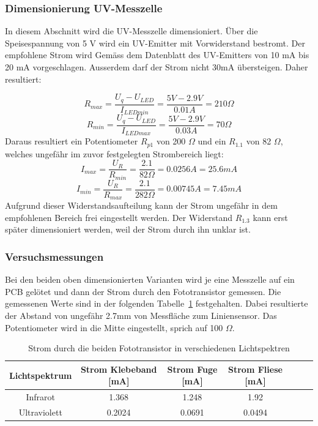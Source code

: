 \documentclass[main.tex]{subfiles} %
\begin{document}

\subsubsection{Dimensionierung UV-Messzelle}
In diesem Abschnitt wird die UV-Messzelle dimensioniert.
Über die Speisespannung von 5 V wird ein UV-Emitter mit Vorwiderstand bestromt. Der empfohlene Strom
wird Gemäss dem Datenblatt des UV-Emitters von 10 mA bis 20 mA vorgeschlagen. Ausserdem darf der Strom nicht 
30mA übersteigen. Daher resultiert: 

\[
    R_{max} = \frac{U_q - U_{LED}}{I_{LEDmin}} = \frac{5 V - 2.9 V}{0.01A} = 210 \Omega
\]
\[
    R_{min} = \frac{U_q - U_{LED}}{I_{LEDmax}} = \frac{5 V - 2.9 V}{0.03A} = 70 \Omega
\]
Daraus resultiert ein Potentiometer $R_{p1}$ von 200 $\Omega$ und ein $R_{1.1}$ von 82 $\Omega$, welches ungefähr im zuvor festgelegten
Strombereich liegt:
\[
    I_{max} = \frac{U_R}{R_{min}} = \frac{2.1}{82 \Omega} = 0.0256 A = 25.6 mA
\]
\[
    I_{min} = \frac{U_R}{R_{max}} = \frac{2.1}{282 \Omega} = 0.00745 A = 7.45 mA
\]
Aufgrund dieser Widerstandsaufteilung kann der Strom ungefähr in dem empfohlenen Bereich frei eingestellt werden.
Der Widerstand $R_{1.3}$ kann erst später dimensioniert werden, weil der Strom durch ihn unklar ist.

\subsubsection{Versuchsmessungen}
Bei den beiden oben dimensionierten Varianten wird je eine Messzelle auf ein PCB gelötet und dann der Strom durch den
Fototransistor gemessen. Die gemessenen Werte sind in der folgenden Tabelle~\ref{tab:Strommessungen_einzeln} festgehalten. Dabei resultierte der 
Abstand von ungefähr 2.7mm von Messfläche zum Liniensensor. Das Potentiometer wird in die Mitte eingestellt, sprich
auf 100 $\Omega$.

\begin{table}[h]                                    
    \centering
    \begin{tabular}{|c|c|c|c|c|c|c|}                        
        \hline
        \textbf{Lichtspektrum} & \textbf{Strom Klebeband [mA]}        & \textbf{Strom Fuge [mA]}    & \textbf{Strom Fliese [mA]}\\ \hline
        Infrarot              & 1.368                                 & 1.248                        & 1.92                       \\ \hline
        Ultraviolett          & 0.2024                                & 0.0691                       & 0.0494                     \\ \hline

        \end{tabular}
\caption{Strom durch die beiden Fototransistor in verschiedenen Lichtspektren}
\label{tab:Strommessungen_einzeln}
\end{table}
\end{document}
